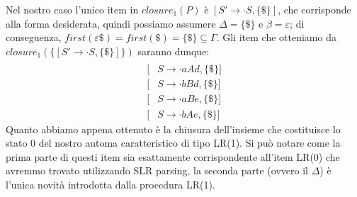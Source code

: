 \documentclass[class=book, crop=false, oneside, 12pt]{standalone}
\begin{document}
Nel nostro caso l'unico item in \(closure_1(P)\) è \([S' \to \cdot S, \{\$\}]\), che corrisponde alla forma desiderata, quindi possiamo assumere \(\Delta = \{\$\} \textrm{ e } \beta = \varepsilon\); di conseguenza, \(first(\varepsilon \$) = first(\$) = \{\$\} \subseteq \Gamma\). Gli item che otteniamo da \(closure_1(\{[S' \to \cdot S, \{\$\}]\})\) saranno dunque:
\begin{align*}
    [&S' \to \cdot S, \{\$\}] \\
    [&S \to \cdot aAd, \{\$\}] \\
	[&S \to \cdot bBd, \{\$\}] \\
	[&S \to \cdot aBe, \{\$\}] \\
	[&S \to \cdot bAe, \{\$\}]
\end{align*}
Quanto abbiamo appena ottenuto è la chiusura dell'insieme che costituisce lo stato 0 del nostro automa caratteristico di tipo LR(1).
Si può notare come la prima parte di questi item sia esattamente corrispondente all'item LR(0) che avremmo trovato utilizzando SLR parsing, la seconda parte (ovvero il \(\Delta\)) è l'unica novità introdotta dalla procedura LR(1).
\end{document}
